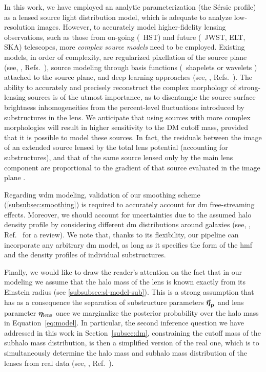 In this work, we have employed an analytic parameterization (the Sérsic profile) as a lensed source light distribution model, which is adequate to analyze low-resolution images. However, to accurately model higher-fidelity lensing observations, such as those from on-going (\eg~HST) and future (\eg~JWST, ELT, SKA) telescopes, more \emph{complex source models} need to be employed. Existing models, in order of complexity, are regularized pixellation of the source plane (see, \eg, Refs.~\cite{Suyu:2006fd, Karchev:2021fro, Vegetti:2008eg}), source modeling through basis functions (\eg~shapelets \cite{Birrer:2018xgm} or wavelets \cite{Galan:2020mnn}) attached to the source plane, and deep learning approaches (see, \eg, Refs.~\cite{Adam:2022esz, Morningstar:2019szx}).
The ability to accurately and precisely reconstruct the complex morphology of strong-lensing sources is of the utmost importance, as to disentangle the source surface brightness inhomogeneities from the percent-level fluctuations introduced by substructures in the lens. We anticipate that using sources with more complex morphologies will result in higher sensitivity to the DM cutoff mass, provided that it is possible to model these sources. In fact, the residuals between the image of an extended source lensed by the total lens potential (accounting for substructures), and that of the same source lensed only by the main lens component are proportional to the gradient of that source evaluated in the image plane \cite[Equation 16]{Cyr-Racine:2019aa}. 

Regarding \gls*{wdm} modeling, validation of our smoothing scheme (\autoref{subsubsec:smoothing}) is required to accurately account for \gls*{dm} free-streaming effects. Moreover, we should account for uncertainties due to the assumed halo density profile by considering different \gls*{dm} distributions around galaxies (see, \eg, Ref.~\cite{Salucci:2018aa} for a review). We note that, thanks to its flexibility, our pipeline can incorporate any arbitrary \gls*{dm} model, as long as it specifies the form of the \gls*{hmf} and the density profiles of individual substructures. 
 
Finally, we would like to draw the reader's attention on the fact that in our modeling we assume that the halo mass of the lens is known exactly from its Einstein radius (see \autoref{subsubsec:sl-model-sub}). 
This is a strong assumption that has as a consequence the separation of substructure parameters $\boldsymbol{\vec{{\bm{\eta}}}_\mathrm{p}}$ and lens parameter $\bm{\eta}_\mathrm{lens}$ once we marginalize the posterior probability over the halo mass in Equation~\eqref{eq:model}.
In particular, the second inference question we have addressed in this work in Section~\ref{subsec:dm}, constraining the cutoff mass of the subhalo mass distribution, is then a simplified version of the real one, which is to simultaneously determine the halo mass and subhalo mass distribution of the lenses from real data (see, \eg, Ref.~\cite{Birrer:2017rpp}). 

